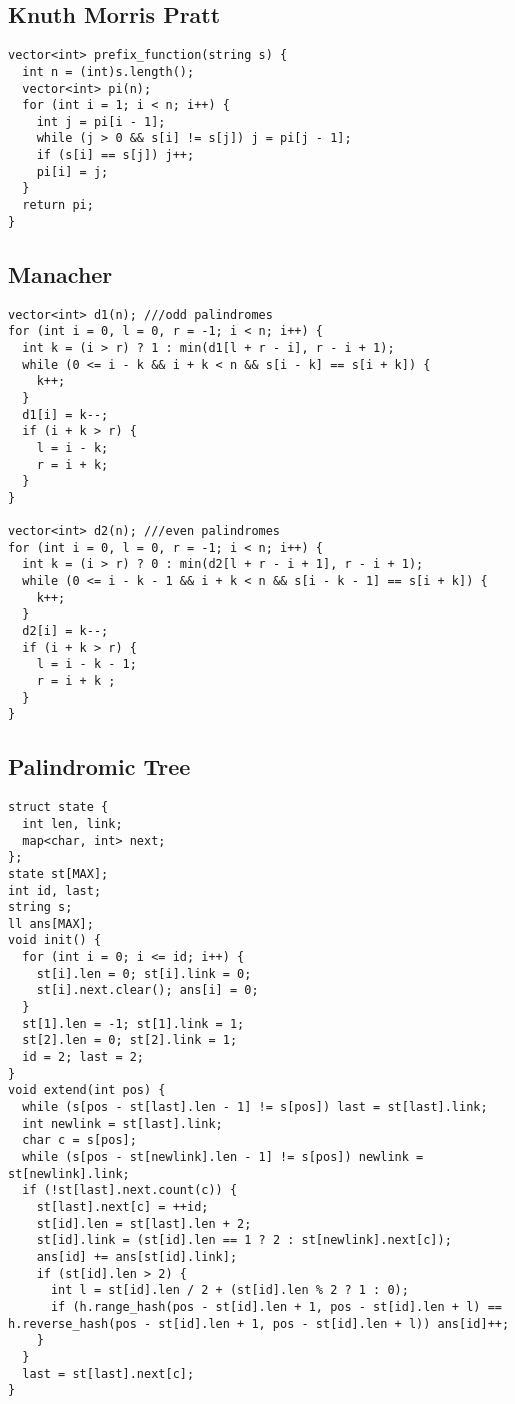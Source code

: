 \documentclass[10pt,a4paper,onesided]{article}
\begin{document}
\begin{multicols*}{3}
\subsection{Knuth Morris Pratt}
\begin{lstlisting}
vector<int> prefix_function(string s) {
  int n = (int)s.length();
  vector<int> pi(n);
  for (int i = 1; i < n; i++) {
    int j = pi[i - 1];
    while (j > 0 && s[i] != s[j]) j = pi[j - 1];
    if (s[i] == s[j]) j++;
    pi[i] = j;
  }
  return pi;
}
\end{lstlisting}
\subsection{Manacher}
\begin{lstlisting}
vector<int> d1(n); ///odd palindromes
for (int i = 0, l = 0, r = -1; i < n; i++) {
  int k = (i > r) ? 1 : min(d1[l + r - i], r - i + 1);
  while (0 <= i - k && i + k < n && s[i - k] == s[i + k]) {
    k++;
  }
  d1[i] = k--;
  if (i + k > r) {
    l = i - k;
    r = i + k;
  }
}

vector<int> d2(n); ///even palindromes
for (int i = 0, l = 0, r = -1; i < n; i++) {
  int k = (i > r) ? 0 : min(d2[l + r - i + 1], r - i + 1);
  while (0 <= i - k - 1 && i + k < n && s[i - k - 1] == s[i + k]) {
    k++;
  }
  d2[i] = k--;
  if (i + k > r) {
    l = i - k - 1;
    r = i + k ;
  }
}\end{lstlisting}
\subsection{Palindromic Tree}
\begin{lstlisting}
struct state {
  int len, link;
  map<char, int> next;
};
state st[MAX];
int id, last;
string s;
ll ans[MAX];
void init() {
  for (int i = 0; i <= id; i++) {
    st[i].len = 0; st[i].link = 0;
    st[i].next.clear(); ans[i] = 0;
  }
  st[1].len = -1; st[1].link = 1;
  st[2].len = 0; st[2].link = 1;
  id = 2; last = 2;
}
void extend(int pos) {
  while (s[pos - st[last].len - 1] != s[pos]) last = st[last].link;
  int newlink = st[last].link;
  char c = s[pos];
  while (s[pos - st[newlink].len - 1] != s[pos]) newlink = st[newlink].link;
  if (!st[last].next.count(c)) {
    st[last].next[c] = ++id;
    st[id].len = st[last].len + 2;
    st[id].link = (st[id].len == 1 ? 2 : st[newlink].next[c]);
    ans[id] += ans[st[id].link];
    if (st[id].len > 2) {
      int l = st[id].len / 2 + (st[id].len % 2 ? 1 : 0);
      if (h.range_hash(pos - st[id].len + 1, pos - st[id].len + l) == h.reverse_hash(pos - st[id].len + 1, pos - st[id].len + l)) ans[id]++;
    }
  }
  last = st[last].next[c];
}
\end{lstlisting}

\end{multicols*}
\end{document}
